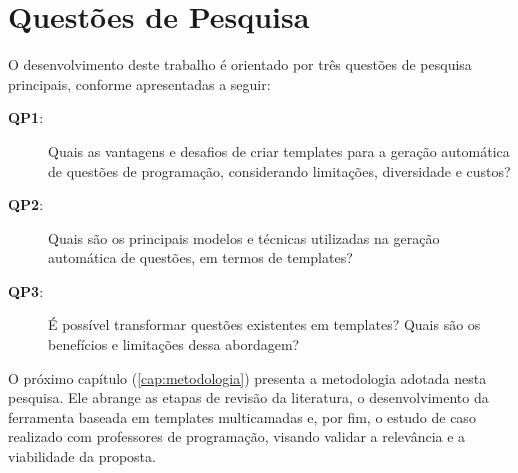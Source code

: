 \section{Questões de Pesquisa}

O desenvolvimento deste trabalho é orientado por três questões de pesquisa principais, conforme apresentadas a seguir:\\

\begin{description}
    \item[\textbf{QP1}:] Quais as vantagens e desafios de criar templates para a geração automática de questões de programação, considerando limitações, diversidade e custos?
    \item[\textbf{QP2}:] Quais são os principais modelos e técnicas utilizadas na geração automática de questões, em termos de templates?
    \item[\textbf{QP3}:] É possível transformar questões existentes em templates? Quais são os benefícios e limitações dessa abordagem?

\end{description}

O próximo capítulo (\autoref{cap:metodologia})  presenta a metodologia adotada nesta pesquisa. Ele abrange as etapas de revisão da literatura, o desenvolvimento da ferramenta baseada em templates multicamadas e, por fim, o estudo de caso realizado com professores de programação, visando validar a relevância e a viabilidade da proposta.  




